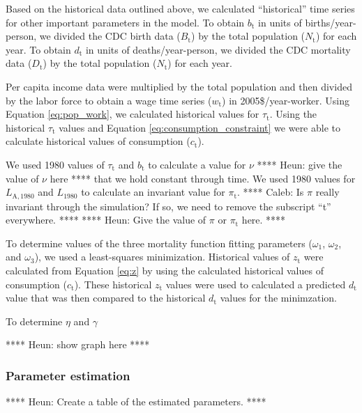 \documentclass[letterpaper,12pt]{article}
\begin{document}
Based on the historical data outlined above, we calculated ``historical'' time series for other important parameters in the model. To obtain $b_\mathrm{t}$ in units of births/year-person, we divided the CDC birth data ($B_\mathrm{t}$) by the total population ($N_\mathrm{t}$) for each year. To obtain $d_\mathrm{t}$ in units of deaths/year-person, we divided the CDC mortality data ($D_\mathrm{t}$) by the total population ($N_\mathrm{t}$) for each year.

Per capita income data were multiplied by the total population and then divided by the labor force to obtain a wage time series ($w_\mathrm{t}$) in 2005\$/year-worker. Using Equation \ref{eq:pop_work}, we calculated historical values for $\tau_\mathrm{t}$. Using the historical $\tau_\mathrm{t}$ values and Equation \ref{eq:consumption_constraint} we were able to calculate historical values of consumption ($c_\mathrm{t}$). 

We used 1980 values of $\tau_\mathrm{t}$ and $b_\mathrm{t}$ to calculate a value for $\nu$ **** Heun: give the value of $\nu$ here **** that we hold constant through time. We used 1980 values for $L_\mathrm{A,1980}$ and $L_{1980}$ to calculate an invariant value for $\pi_\mathrm{t}$. **** Caleb: Is $\pi$ really invariant through the simulation? If so, we need to remove the subscript ``t'' everywhere. **** **** Heun: Give the value of $\pi$ or $\pi_\mathrm{t}$ here. ****

To determine values of the three mortality function fitting parameters ($\omega_\mathrm{1}$, $\omega_\mathrm{2}$, and $\omega_\mathrm{3}$), we used a least-squares minimization. Historical values of $z_\mathrm{t}$ were calculated from Equation \ref{eq:z} by using the calculated historical values of consumption ($c_\mathrm{t}$). These historical $z_\mathrm{t}$ values were used to calculated a predicted $d_\mathrm{t}$ value that was then compared to the historical $d_\mathrm{t}$ values for the minimzation. 

To determine $\eta$ and $\gamma$

**** Heun: show graph here ****

\subsubsection{Parameter estimation}
\label{sec:basic_model_parameter_estimation}

**** Heun: Create a table of the estimated parameters. ****
\end{document}
